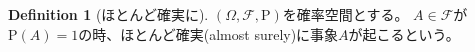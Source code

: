 \documentclass{ltjsarticle}
\theoremstyle{definition}
\newtheorem{dfn}{Definition}[subsubsection]
\begin{document}
\begin{dfn}[ほとんど確実に]
    $(\Omega , \mathcal{F} , \mathrm{P})$を確率空間とする。
    $A \in \mathcal{F}$が$\mathrm{P}(A)=1$の時、ほとんど確実(almost surely)に事象$A$が起こるという。
\end{dfn}



% 
% 
\end{document}
